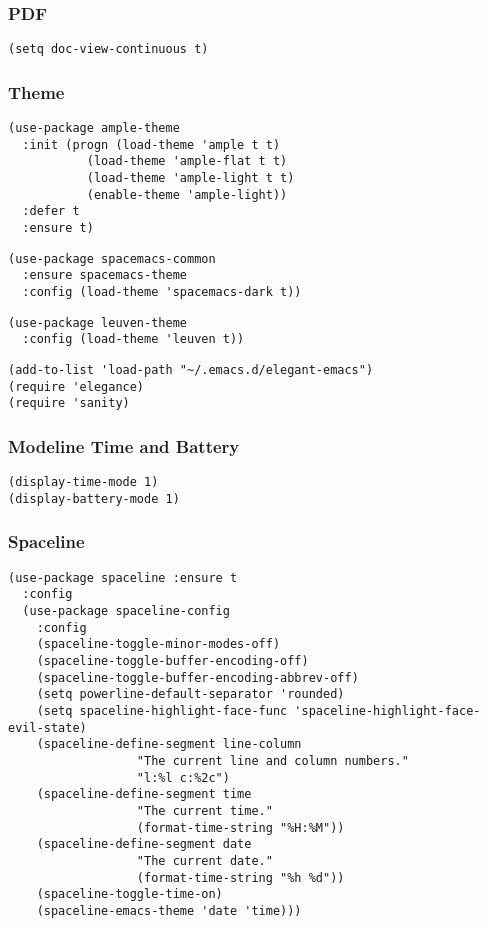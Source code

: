 \documentclass[11pt]{article}
\begin{document}
\subsubsection{PDF}
\label{sec:org1b0d218}
\begin{verbatim}
(setq doc-view-continuous t)
\end{verbatim}
\subsubsection{Theme}
\label{sec:org9506ec7}

\begin{verbatim}
(use-package ample-theme 
  :init (progn (load-theme 'ample t t)
	       (load-theme 'ample-flat t t)
	       (load-theme 'ample-light t t)
	       (enable-theme 'ample-light))
  :defer t
  :ensure t)
\end{verbatim}

\begin{verbatim}
(use-package spacemacs-common
  :ensure spacemacs-theme
  :config (load-theme 'spacemacs-dark t))
\end{verbatim}

\begin{verbatim}
(use-package leuven-theme
  :config (load-theme 'leuven t))
\end{verbatim}

\begin{verbatim}
(add-to-list 'load-path "~/.emacs.d/elegant-emacs")
(require 'elegance)
(require 'sanity)
\end{verbatim}

\subsubsection{Modeline Time and Battery}
\label{sec:org556bb39}
\begin{verbatim}
(display-time-mode 1)
(display-battery-mode 1)
\end{verbatim}

\subsubsection{Spaceline}
\label{sec:org4d581a8}
\begin{verbatim}
(use-package spaceline :ensure t
  :config
  (use-package spaceline-config
    :config
    (spaceline-toggle-minor-modes-off)
    (spaceline-toggle-buffer-encoding-off)
    (spaceline-toggle-buffer-encoding-abbrev-off)
    (setq powerline-default-separator 'rounded)
    (setq spaceline-highlight-face-func 'spaceline-highlight-face-evil-state)
    (spaceline-define-segment line-column
			      "The current line and column numbers."
			      "l:%l c:%2c")
    (spaceline-define-segment time
			      "The current time."
			      (format-time-string "%H:%M"))
    (spaceline-define-segment date
			      "The current date."
			      (format-time-string "%h %d"))
    (spaceline-toggle-time-on)
    (spaceline-emacs-theme 'date 'time)))

\end{verbatim}
\end{document}
